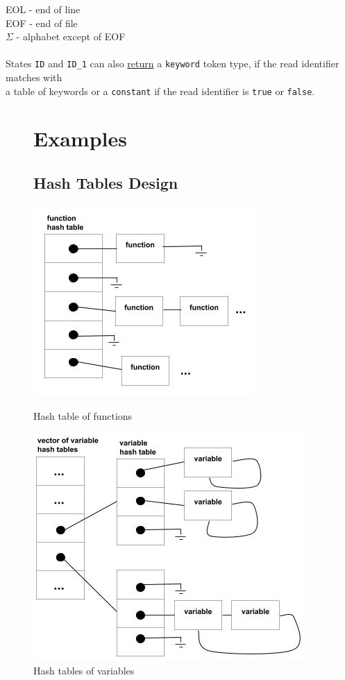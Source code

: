 \documentclass[12pt]{article}
\begin{document}
\vspace{0.5cm}
\hspace{-0.6cm}EOL - end of line\\
EOF - end of file\\
$\Sigma$ - alphabet except of EOF\\
\\
States \texttt{ID} and \texttt{ID\_1} can also \hyperref[sec:retsymbols]{return} a \texttt{keyword} token type, if the read identifier matches with\\a table of keywords or a \texttt{constant} if the read identifier is \texttt{true} or \texttt{false}.





\begin{figure}
\section{Examples}
\label{sec:examples}
\subsection{Hash Tables Design}
\begin{center}
		\includegraphics[scale=3.5]{img/FHT.jpg}
		\caption{Hash table of functions}
		\vspace{1.5cm}
		\includegraphics[scale=3.5]{img/VHT.jpg}
		\caption{Hash tables of variables}
\end{center}
\end{figure}
\end{document}
